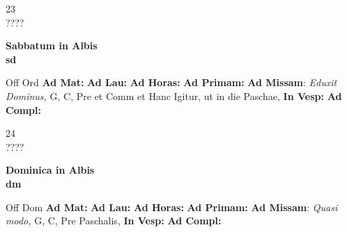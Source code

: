 \documentclass[10pt, openany]{book}
\begin{document}
    \begin{center}
        \begin{minipage}{3.5in}
            \vspace{2em}
            \begin{minipage}{0.5in}
                {\Huge 23} \\
                {\normalsize ????}
            \end{minipage}
            \begin{minipage}{3.0in}
                \textbf{ \large Sabbatum in Albis \\
                \textnormal{\normalsize sd}}

            \end{minipage}
            \begin{justify}Off Ord
                \textbf{Ad Mat: }
                \textbf{Ad Lau: }
                \textbf{Ad Horas: }
                \textbf{Ad Primam: }\textbf{Ad Missam}: \textit{Eduxit Dominus,} G, C, Pre et Comm et Hanc Igitur, ut in die Paschae, 
                \textbf{In Vesp: }
                \textbf{Ad Compl: }
            \end{justify}
        \end{minipage}
    \end{center}

    \begin{center}
        \begin{minipage}{3.5in}
            \vspace{2em}
            \begin{minipage}{0.5in}
                {\Huge 24} \\
                {\normalsize ????}
            \end{minipage}
            \begin{minipage}{3.0in}
                \textbf{ \large Dominica in Albis \\
                \textnormal{\normalsize dm}}

            \end{minipage}
            \begin{justify}Off Dom
                \textbf{Ad Mat: }
                \textbf{Ad Lau: }
                \textbf{Ad Horas: }
                \textbf{Ad Primam: }\textbf{Ad Missam}: \textit{Quasi modo,} G, C, Pre Paschalis, 
                \textbf{In Vesp: }
                \textbf{Ad Compl: }
            \end{justify}
        \end{minipage}
    \end{center}
\end{document}
